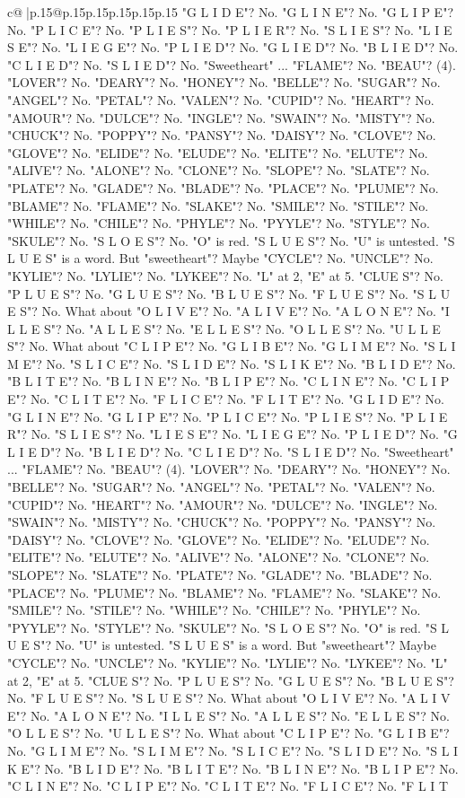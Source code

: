 \documentclass{article}
\begin{document}
{\begin{supertabular}{c@{$\;$}|p{.15\linewidth}@{}p{.15\linewidth}p{.15\linewidth}p{.15\linewidth}p{.15\linewidth}p{.15\linewidth}}
{{{"G L I D E"? No. "G L I N E"? No. "G L I P E"? No. "P L I C E"? No. "P L I E S"? No. "P L I E R"? No. "S L I E S"? No. "L I E S E"? No. "L I E G E"? No. "P L I E D"? No. "G L I E D"? No. "B L I E D"? No. "C L I E D"? No. "S L I E D"? No. "Sweetheart" ... "FLAME"? No. "BEAU"? (4). "LOVER"? No. "DEARY"? No. "HONEY"? No. "BELLE"? No. "SUGAR"? No. "ANGEL"? No. "PETAL"? No. "VALEN"? No. "CUPID"? No. "HEART"? No. "AMOUR"? No. "DULCE"? No. "INGLE"? No. "SWAIN"? No. "MISTY"? No. "CHUCK"? No. "POPPY"? No. "PANSY"? No. "DAISY"? No. "CLOVE"? No. "GLOVE"? No. "ELIDE"? No. "ELUDE"? No. "ELITE"? No. "ELUTE"? No. "ALIVE"? No. "ALONE"? No. "CLONE"? No. "SLOPE"? No. "SLATE"? No. "PLATE"? No. "GLADE"? No. "BLADE"? No. "PLACE"? No. "PLUME"? No. "BLAME"? No. "FLAME"? No. "SLAKE"? No. "SMILE"? No. "STILE"? No. "WHILE"? No. "CHILE"? No. "PHYLE"? No. "PYYLE"? No. "STYLE"? No. "SKULE"? No. "S L O E S"? No. "O" is red. "S L U E S"? No. "U" is untested. "S L U E S" is a word. But "sweetheart"? Maybe "CYCLE"? No. "UNCLE"? No. "KYLIE"? No. "LYLIE"? No. "LYKEE"? No. "L" at 2, "E" at 5. "CLUE S"? No. "P L U E S"? No. "G L U E S"? No. "B L U E S"? No. "F L U E S"? No. "S L U E S"? No. What about "O L I V E"? No. "A L I V E"? No. "A L O N E"? No. "I L L E S"? No. "A L L E S"? No. "E L L E S"? No. "O L L E S"? No. "U L L E S"? No. What about "C L I P E"? No. "G L I B E"? No. "G L I M E"? No. "S L I M E"? No. "S L I C E"? No. "S L I D E"? No. "S L I K E"? No. "B L I D E"? No. "B L I T E"? No. "B L I N E"? No. "B L I P E"? No. "C L I N E"? No. "C L I P E"? No. "C L I T E"? No. "F L I C E"? No. "F L I T E"? No. "G L I D E"? No. "G L I N E"? No. "G L I P E"? No. "P L I C E"? No. "P L I E S"? No. "P L I E R"? No. "S L I E S"? No. "L I E S E"? No. "L I E G E"? No. "P L I E D"? No. "G L I E D"? No. "B L I E D"? No. "C L I E D"? No. "S L I E D"? No. "Sweetheart" ... "FLAME"? No. "BEAU"? (4). "LOVER"? No. "DEARY"? No. "HONEY"? No. "BELLE"? No. "SUGAR"? No. "ANGEL"? No. "PETAL"? No. "VALEN"? No. "CUPID"? No. "HEART"? No. "AMOUR"? No. "DULCE"? No. "INGLE"? No. "SWAIN"? No. "MISTY"? No. "CHUCK"? No. "POPPY"? No. "PANSY"? No. "DAISY"? No. "CLOVE"? No. "GLOVE"? No. "ELIDE"? No. "ELUDE"? No. "ELITE"? No. "ELUTE"? No. "ALIVE"? No. "ALONE"? No. "CLONE"? No. "SLOPE"? No. "SLATE"? No. "PLATE"? No. "GLADE"? No. "BLADE"? No. "PLACE"? No. "PLUME"? No. "BLAME"? No. "FLAME"? No. "SLAKE"? No. "SMILE"? No. "STILE"? No. "WHILE"? No. "CHILE"? No. "PHYLE"? No. "PYYLE"? No. "STYLE"? No. "SKULE"? No. "S L O E S"? No. "O" is red. "S L U E S"? No. "U" is untested. "S L U E S" is a word. But "sweetheart"? Maybe "CYCLE"? No. "UNCLE"? No. "KYLIE"? No. "LYLIE"? No. "LYKEE"? No. "L" at 2, "E" at 5. "CLUE S"? No. "P L U E S"? No. "G L U E S"? No. "B L U E S"? No. "F L U E S"? No. "S L U E S"? No. What about "O L I V E"? No. "A L I V E"? No. "A L O N E"? No. "I L L E S"? No. "A L L E S"? No. "E L L E S"? No. "O L L E S"? No. "U L L E S"? No. What about "C L I P E"? No. "G L I B E"? No. "G L I M E"? No. "S L I M E"? No. "S L I C E"? No. "S L I D E"? No. "S L I K E"? No. "B L I D E"? No. "B L I T E"? No. "B L I N E"? No. "B L I P E"? No. "C L I N E"? No. "C L I P E"? No. "C L I T E"? No. "F L I C E"? No. "F L I T }}}
\end{supertabular}}
\end{document}
